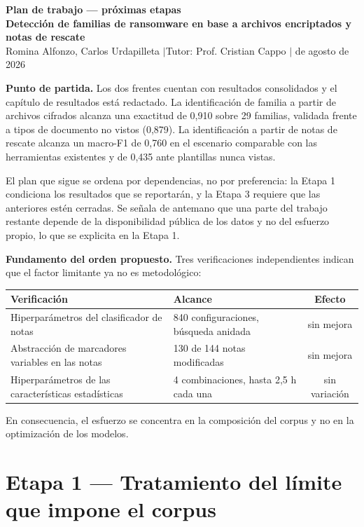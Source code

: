 \documentclass[11pt,a4paper]{article}
\begin{document}
{\large\textbf{Plan de trabajo --- próximas etapas}}\\[2pt]
\textbf{Detección de familias de ransomware en base a archivos encriptados y notas de rescate}\\[2pt]
Romina Alfonzo, Carlos Urdapilleta \quad$\vert$\quad Tutor: Prof. Cristian Cappo \quad$\vert$ de agosto de 2026

\hrulefill

\textbf{Punto de partida.} Los dos frentes cuentan con resultados consolidados y el capítulo de
resultados está redactado. La identificación de familia a partir de archivos cifrados alcanza
una exactitud de 0,910 sobre 29 familias, validada frente a tipos de documento no vistos
(0,879). La identificación a partir de notas de rescate alcanza un macro-F1 de 0,760 en el
escenario comparable con las herramientas existentes y de 0,435 ante plantillas nunca vistas.

El plan que sigue se ordena por dependencias, no por preferencia: la Etapa 1 condiciona los
resultados que se reportarán, y la Etapa 3 requiere que las anteriores estén cerradas. Se
señala de antemano que una parte del trabajo restante depende de la disponibilidad pública de
los datos y no del esfuerzo propio, lo que se explicita en la Etapa 1.

\textbf{Fundamento del orden propuesto.} Tres verificaciones independientes indican que el
factor limitante ya no es metodológico:

\begin{center}
\small
\begin{tabular}{@{}llc@{}}
\toprule
\textbf{Verificación} & \textbf{Alcance} & \textbf{Efecto} \\
\midrule
Hiperparámetros del clasificador de notas & 840 configuraciones, búsqueda anidada & sin mejora \\
Abstracción de marcadores variables en las notas & 130 de 144 notas modificadas & sin mejora \\
Hiperparámetros de las características estadísticas & 4 combinaciones, hasta 2,5 h cada una & sin variación \\
\bottomrule
\end{tabular}
\end{center}

En consecuencia, el esfuerzo se concentra en la composición del corpus y no en la
optimización de los modelos.

\section*{Etapa 1 --- Tratamiento del límite que impone el corpus}
\end{document}
